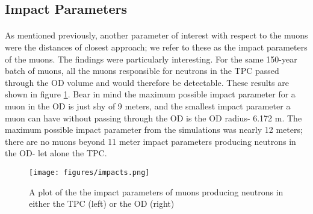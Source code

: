 \subsection{Impact Parameters}

\paragraph{}
As mentioned previously, another parameter of interest with respect to the muons were the distances of closest approach; we refer to these as the impact parameters of the muons. The findings were particularly interesting. For the same 150-year batch of muons, all the muons responsible for neutrons in the TPC passed through the OD volume and would therefore be detectable. These results are shown in figure \ref{fig:impacts}. Bear in mind the maximum possible impact parameter for a muon in the OD is just shy of 9 meters, and the smallest impact parameter a muon can have without passing through the OD is the OD radius- 6.172 m. The maximum possible impact parameter from the simulations was nearly 12 meters; there are no muons beyond 11 meter impact parameters producing neutrons in the OD- let alone the TPC.

\begin{figure}[h]
    \begin{center}
    \texttt{[image: figures/impacts.png]}
    \caption{A plot of the the impact parameters of muons producing neutrons in either the TPC (left) or the OD (right)}
    \label{fig:impacts}
    \end{center}
\end{figure}
